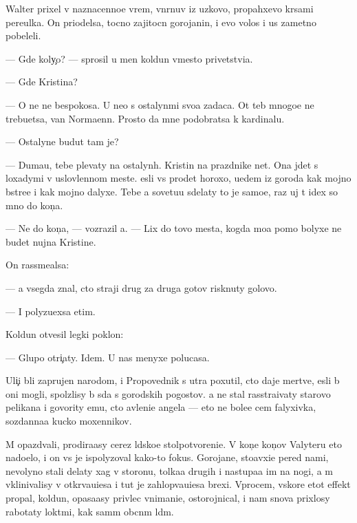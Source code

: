 \documentclass[10pt]{book}
\begin{document}
Walter prixel v naznacenno{\y}e vrem{\ia}, v{\yi}n{\yi}rnuv iz uzkovo, propahxevo kr{\yi}sami pereulka. On priodelsa, tocno zajitocn{\yi}{\y} gorojanin, i {\y}evo volos{\yi} i us{\yi} zametno pobeleli.

— Gde koly{\c}o? — sprosil u men{\ia} koldun vmesto privetstvi{\y}a.

— Gde Kristina?

— O ne{\y} ne bespoko{\y}sa. U ne{\y}o s ostalyn{\yi}mi svo{\y}a zadaca. Ot teb{\ia} mnogo{\y}e ne trebu{\y}etsa, van Normaenn. Prosto da{\y} mne podobratsa k kardinalu.

— Ostalyn{\yi}{\y}e budut tam je?

— Duma{\y}u, tebe plevaty na ostalyn{\yi}h. Kristin{\yi} na prazdnike net. Ona jdet s loxadymi v uslovlennom meste. {\Y}esli vs{\e} pro{\y}det horoxo, u{\y}edem iz goroda kak mojno b{\yi}stre{\y}e i kak mojno dalyxe. Tebe {\y}a sovetu{\y}u sdelaty to je samo{\y}e, raz uj t{\yi} idex so mno{\y} do kon{\c}a.

— Ne do kon{\c}a, — vozrazil {\y}a. — Lix do tovo mesta, kogda mo{\y}a pomo{\x} bolyxe ne budet nujna Kristine.

On rassme{\y}alsa:

— {\Y}a vsegda znal, cto straji drug za druga gotov{\yi} risknuty golovo{\y}.

— I polyzu{\y}exsa etim.

Koldun otvesil legki{\y} poklon:

— Glupo otri{\c}aty. Idem. U nas menyxe polucasa.

Uli{\c}i b{\yi}li zaprujen{\yi} narodom, i Propovednik s utra poxutil, cto daje mertv{\yi}{\y}e, {\y}esli b{\yi} oni mogli, spolzlisy b{\yi} s{\iu}da s gorodskih pogostov. {\Y}a ne stal rasstra{\y}ivaty starovo pelikana i govority {\y}emu, cto {\y}avleni{\y}e angela — eto ne bole{\y}e cem falyxivka, sozdanna{\y}a kucko{\y} moxennikov.

M{\yi} opazd{\yi}vali, prodira{\y}asy cerez l{\iu}dsko{\y}e stolpotvoreni{\y}e. V kon{\c}e kon{\c}ov Valyteru eto nado{\y}elo, i on vs{\e} je ispolyzoval kako{\y}-to fokus. Gorojane, sto{\y}avxi{\y}e pered nami, nevolyno stali delaty xag v storonu, tolka{\y}a drugih i nastupa{\y}a im na nogi, a m{\yi} vklinivalisy v otkr{\yi}va{\y}u{\x}i{\y}esa i tut je zahlop{\yi}va{\y}u{\x}i{\y}esa brexi. Vprocem, vskore etot effekt propal, koldun, opasa{\y}asy privlec vnimani{\y}e, ostorojnical, i nam snova prixlosy rabotaty lokt{\ia}mi, kak sam{\yi}m ob{\yi}cn{\yi}m l{\iu}d{\ia}m.
\end{document}
